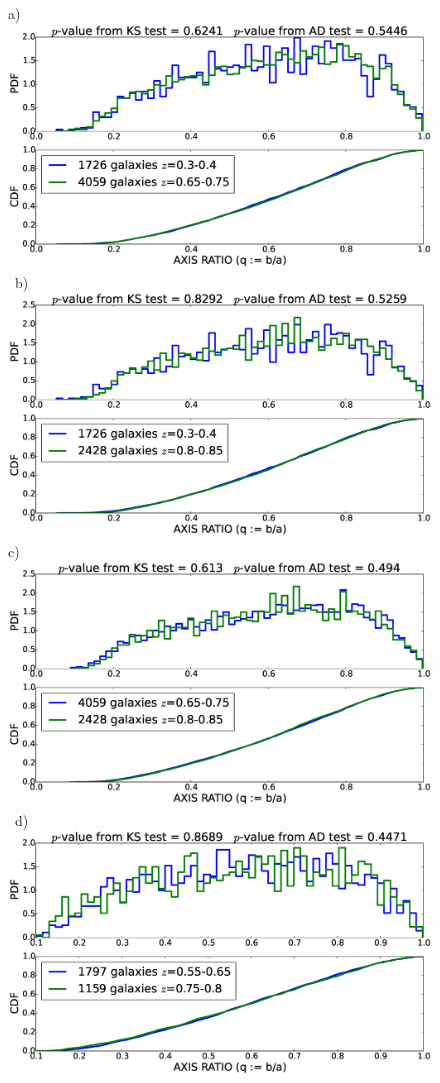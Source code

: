 \documentclass[twocolumn,useAMS,usenatbib]{mn2e}
\begin{document}
\begin{figure}
 \centering
 a) \includegraphics[width=0.9\columnwidth]{axisratio(0)_0dot3-0dot4_0dot65-0dot75.eps} \
 b) \includegraphics[width=0.9\columnwidth]{axisratio(0)_0dot3-0dot4_0dot80-0dot85.eps} \\
 c) \includegraphics[width=0.9\columnwidth]{axisratio(0)_0dot65-0dot75_0dot80-0dot85.eps} \
 d) \includegraphics[width=0.9\columnwidth]{axisratio(0)_0dot55-0dot65_0dot75-0dot8.eps} \

\end{figure}
\end{document}
